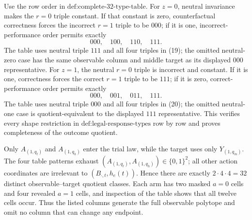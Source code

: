 Use the row order in \(\text{def:complete-32-type-table}\).  For \(z=0\), neutral invariance makes the \(r=0\) triple constant.  If that constant is zero, counterfactual correctness forces the incorrect \(r=1\) triple to be \(000\); if it is one, incorrect-performance order permits exactly
\[
000,\quad100,\quad110,\quad111.
\tag{19}
\]
The table uses neutral triple \(111\) and all four triples in (19); the omitted neutral-zero case has the same observable column and middle target as its displayed \(000\) representative.  For \(z=1\), the neutral \(r=0\) triple is incorrect and constant.  If it is one, correctness forces the correct \(r=1\) triple to be \(111\); if it is zero, correct-performance order permits exactly
\[
000,\quad001,\quad011,\quad111.
\tag{20}
\]
The table uses neutral triple \(000\) and all four triples in (20); the omitted neutral-one case is quotient-equivalent to the displayed \(111\) representative.  This verifies every shape restriction in \(\text{def:legal-response-types}\) row by row and proves completeness of the outcome quotient.

Only \(A_{(1,q_\ell)}\) and \(A_{(1,q_h)}\) enter the trial law, while the target uses only \(Y_{(1,q_m)}\).  The four table patterns exhaust \((A_{(1,q_\ell)},A_{(1,q_h)})\in\{0,1\}^2\); all other action coordinates are irrelevant to \((B_{\cdot,t},h_e(t))\).  Hence there are exactly \(2\cdot4\cdot4=32\) distinct observable--target quotient classes.  Each arm has two masked \(a=0\) cells and four revealed \(a=1\) cells, and inspection of the table shows that all twelve cells occur.  Thus the listed columns generate the full observable polytope and omit no column that can change any endpoint.

